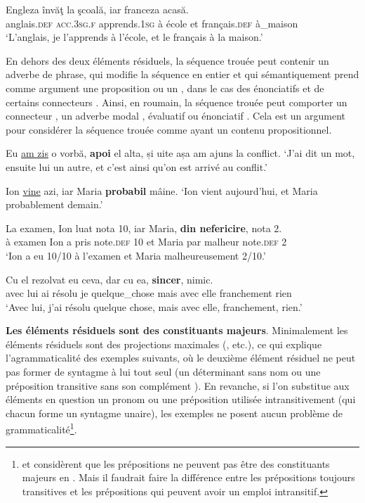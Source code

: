 \ex  
\gll Engleza    învăţ  la  şcoală,  iar  franceza  acasă. \label{ch2:ex115e}\\
anglais.\textsc{def}  \textsc{acc.3sg.f}  apprends.\textsc{1sg}  à  école  et  français\textsc{.def}  à\_maison\\
\glt  ‘L’anglais, je l’apprends à l’école, et le français à la maison.’
\z
\z

En dehors des deux éléments résiduels, la séquence trouée peut contenir un adverbe de phrase, qui modifie la séquence en entier et qui sémantiquement prend comme argument une proposition ou un , dans le cas des énonciatifs et de certains connecteurs \citep{BonamiEtAl2005}. Ainsi, en roumain, la séquence trouée peut comporter un connecteur , un adverbe modal , évaluatif  ou énonciatif . Cela est un argument pour considérer la séquence trouée comme ayant un contenu propositionnel. 

\ea
\ea Eu \uline{am zis} o vorbă, \textbf{apoi} el alta, și uite așa am ajuns la conflict. \label{ch2:ex116a}
\glt  ‘J’ai dit un mot, ensuite lui un autre, et c’est ainsi qu’on est arrivé au conflit.’

\ex  Ion \uline{vine} azi, iar Maria \textbf{probabil} mâine. \label{ch2:ex116b}
\glt  ‘Ion vient aujourd’hui, et Maria probablement demain.’

\ex  
\gll La  examen,  Ion    luat  nota  10,  iar  Maria,  \textbf{din  nefericire},  nota  2. \label{ch2:ex116c}\\
à  examen  Ion  a  pris  note.\textsc{def}  10  et  Maria  par  malheur  note.\textsc{def}  2\\
\glt  ‘Ion a eu 10/10 à l’examen et Maria malheureusement 2/10.’  

\ex  
\gll Cu  el    rezolvat  eu  ceva,  dar  cu  ea,  \textbf{sincer},  nimic. \label{ch2:ex116d}\\
avec  lui  ai  résolu  je  quelque\_chose  mais  avec  elle  franchement  rien\\
\glt  ‘Avec lui, j’ai résolu quelque chose, mais avec elle, franchement, rien.’
\z
\z

\textbf{Les éléments résiduels sont des constituants majeurs}. Minimalement les éléments résiduels sont des projections maximales (\citealt{Sag1976,Hartmann2000}, etc.), ce qui explique l’agrammaticalité des exemples suivants, où le deuxième élément résiduel ne peut pas former de syntagme à lui tout seul (un déterminant sans nom  ou une préposition transitive sans son complément ). En revanche, si l’on substitue aux éléments en question un pronom  ou une préposition utilisée intransitivement  (qui chacun forme un syntagme unaire), les exemples ne posent aucun problème de grammaticalité\footnote{
 \citet{Hartmann2000} et \citet{Repp2009} considèrent que les prépositions ne peuvent pas être des constituants majeurs en . Mais il faudrait faire la différence entre les prépositions toujours transitives et les prépositions qui peuvent avoir un emploi intransitif.}.  

